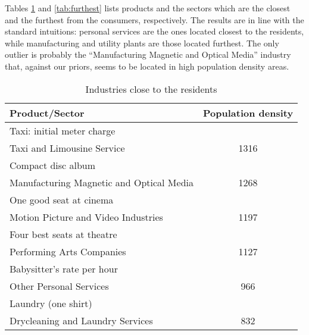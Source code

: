 \documentclass[12pt]{article}
\begin{document}
Tables \ref{tab:closest} and \ref{tab:furthest} lists products and the sectors which are the closest and the furthest from the consumers, respectively. The results are in line with the standard intuitions: personal services are the ones located closest to the residents, while manufacturing and utility plants are those located furthest. The only outlier is probably the ``Manufacturing Magnetic and Optical Media'' industry that, against our priors, seems to be located in high population density areas.

\begin{table}[ht!]
\center
\caption{Industries close to the residents}
\label{tab:closest}
\begin{tabular}{lc}
  \hline
  Product/Sector & Population density \\
  \hline
  Taxi: initial meter charge\\
  \hspace*{1em}Taxi and Limousine Service & 1316\\
  Compact disc album\\
  \hspace*{1em}Manufacturing Magnetic and Optical Media&1268\\
  One good seat at cinema\\
  \hspace*{1em}Motion Picture and Video Industries & 1197\\
  Four best seats at theatre\\
  \hspace*{1em}Performing Arts Companies & 1127\\
  Babysitter's rate per hour\\
  \hspace*{1em}Other Personal Services & 966\\
  Laundry (one shirt)\\
  \hspace*{1em}Drycleaning and Laundry Services & 832\\
  \hline
\end{tabular}
\end{table}
\end{document}
